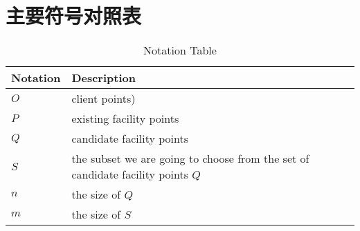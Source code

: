 

\chapter*{主要符号对照表}


\renewcommand{\arraystretch}{0.8}
\begin{longtable}{p{2cm}|p{10cm}}
\caption{Notation Table\label{ltab-1}}\\
 \toprule
 \rowcolor[gray]{.9}
Notation & Description\\
 \midrule
$O$ & client points)\\
$P$ & existing facility points\\
$Q$ & candidate facility points\\
$S$ & the subset we are going to choose from the set of candidate facility points $Q$\\
$n$ & the size of $Q$\\
$m$ & the size of $S$\\
\bottomrule
\end{longtable}
